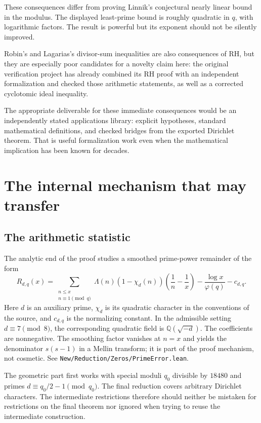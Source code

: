 \documentclass[11pt,letterpaper]{article}
\theoremstyle{definition}\newtheorem{definition}[theorem]{Definition}
\theoremstyle{remark}\newtheorem{remark}[theorem]{Remark}
\newcommand{\Q}{\mathbb Q}\newcommand{\R}{\mathbb R}\newcommand{\C}{\mathbb C}
\newcommand{\src}[1]{\nolinkurl{#1}}
\begin{document}
These consequences differ from proving Linnik's conjectural nearly linear bound in the modulus.
The displayed least-prime bound is roughly quadratic in $q$, with logarithmic factors.
The result is powerful but its exponent should not be silently improved.

Robin's and Lagarias's divisor-sum inequalities are also consequences of RH, but they are
especially poor candidates for a novelty claim here: the original verification project has
already combined its RH proof with an independent formalization and checked those arithmetic
statements, as well as a corrected cyclotomic ideal inequality.\cite{originalchecks}

The appropriate deliverable for these immediate consequences would be an independently
stated applications library: explicit hypotheses, standard mathematical definitions, and checked
bridges from the exported Dirichlet theorem. That is useful formalization work even when
the mathematical implication has been known for decades.

\section{The internal mechanism that may transfer}
\subsection{The arithmetic statistic}
The analytic end of the proof studies a smoothed prime-power remainder of the form
\begin{equation}\label{eq:primeR}
 R_{d,q}(x)=
 \sum_{\substack{n\le x\\n\equiv1\pmod q}}
 \Lambda(n)(1-\chi_d(n))\left(\frac1n-\frac1x\right)
 -\frac{\log x}{\varphi(q)}-c_{d,q}.
\end{equation}
Here $d$ is an auxiliary prime, $\chi_d$ is its quadratic character in the conventions of the
source, and $c_{d,q}$ is the normalizing constant. In the admissible setting $d\equiv7\pmod8$,
the corresponding quadratic field is $\Q(\sqrt{-d})$.
The coefficients are nonnegative. The smoothing factor vanishes at $n=x$ and yields the
denominator $s(s-1)$ in a Mellin transform; it is part of the proof mechanism, not cosmetic.
See \src{New/Reduction/Zeros/PrimeError.lean}.\cite{primeerror,criterion}

The geometric part first works with special moduli $q_0$ divisible by $18480$ and primes
$d\equiv q_0/2-1\pmod{q_0}$. The final reduction covers arbitrary Dirichlet characters.
The intermediate restrictions therefore should neither be mistaken for restrictions on the
final theorem nor ignored when trying to reuse the intermediate construction.
\end{document}
